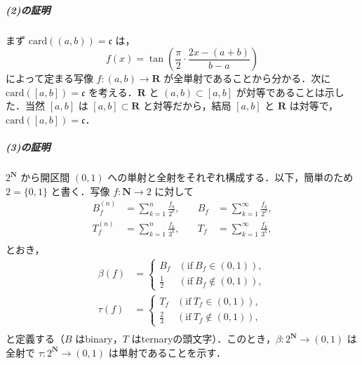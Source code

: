 \documentclass[b5paper,pandoc]{bxjsarticle}
\let\oldsubparagraph\subparagraph
\renewcommand{\subparagraph}[1]{\oldsubparagraph{#1}\mbox{}}
\begin{document}
\hypertarget{ux306eux8a3cux660e-1}{%
\subparagraph{(2)の証明}\label{ux306eux8a3cux660e-1}}

まず \(\mathrm{card}((a, b)) = \mathfrak c\) は， \[
f(x) = \tan\left( \frac \pi2 \cdot \frac{2x - (a + b)}{b - a} \right)
\] によって定まる写像 \(f \colon (a, b) \to \boldsymbol R\)
が全単射であることから分かる．次に
\(\mathrm{card}([a, b]) = \mathfrak c\) を考える．\(\boldsymbol R\) と
\((a, b) \subset [a, b]\) が対等であることは示した．当然 \([a, b]\) は
\([a, b] \subset \boldsymbol R\) と対等だから，結局 \([a, b]\) と
\(\boldsymbol R\) は対等で，\(\mathrm{card}([a, b]) = \mathfrak c\)．

\hypertarget{ux306eux8a3cux660e-2}{%
\subparagraph{(3)の証明}\label{ux306eux8a3cux660e-2}}

\(2^{\boldsymbol N}\) から開区間 \((0, 1)\)
への単射と全射をそれぞれ構成する．以下，簡単のため \(2 = \{ 0, 1 \}\)
と書く．写像 \(f \colon \boldsymbol N \to 2\) に対して \begin{align*}
B_f^{(n)} &= \sum_{k = 1}^n \frac{f_k}{2^k},&\quad B_f &= \sum_{k = 1}^\infty \frac{f_k}{2^k},\\
T_f^{(n)} &= \sum_{k = 1}^n \frac{f_k}{3^k},&\quad T_f &= \sum_{k = 1}^\infty \frac{f_k}{3^k},\\
\end{align*} とおき， \begin{align*}
\beta(f) &= \left\{ \begin{array}{ll} B_f & (\text{if}\ B_f \in (0, 1)),\\ \frac 12 & (\text{if}\ B_f \notin (0, 1)), \end{array} \right. \\
\tau(f) &= \left\{ \begin{array}{ll} T_f & (\text{if}\ T_f \in (0, 1)),\\ \frac 23 & (\text{if}\ T_f \notin (0, 1)), \end{array} \right. \\
\end{align*} と定義する（\(B\) はbinary，\(T\)
はternaryの頭文字）．このとき，\(\beta \colon 2^{\boldsymbol N} \to (0, 1)\)
は全射で \(\tau \colon 2^{\boldsymbol N} \to (0, 1)\)
は単射であることを示す．
\end{document}
